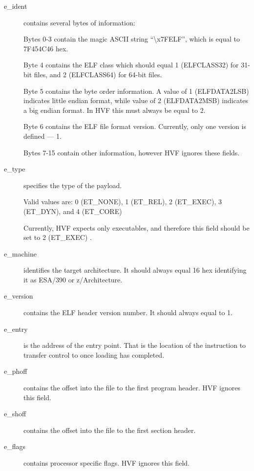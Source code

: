 \begin{description}
\item[e\_ident] contains several bytes of information:
	
	Bytes 0-3 contain the magic ASCII string ``\textbackslash x7FELF'', which is
	equal to 7F454C46 hex.

	Byte 4 contains the ELF class which should equal 1 \cbstart
	(ELFCLASS32) \cbend for 31-bit files, and 2 \cbstart (ELFCLASS64)
	\cbend for 64-bit files.

	Byte 5 contains the byte order information.  A value of 1 \cbstart
	(ELFDATA2LSB) \cbend indicates little endian format, while value of
	2 \cbstart (ELFDATA2MSB) \cbend indicates a big endian format.  In
	HVF this must always be equal to 2.

	Byte 6 contains the ELF file format version.  Currently, only one
	version is defined --- 1.

	Bytes 7-15 contain other information, however HVF ignores these
	fields.

\item[e\_type] specifies the type of the payload.

	\cbstart
	Valid values are: 0 (ET\_NONE), 1 (ET\_REL), 2 (ET\_EXEC), 3
	(ET\_DYN), and 4 (ET\_CORE)
	\cbend

	Currently, HVF expects only executables, and therefore this field
	should be set to 2 \cbstart (ET\_EXEC) \cbend.

\item[e\_machine] identifies the target architecture.  It should always
	equal 16 hex identifying it as ESA/390 or z/Architecture.

\item[e\_version] contains the ELF header version number.  It should always
	equal to 1.

\item[e\_entry] is the address of the entry point.  That is the location of
	the instruction to transfer control to once loading has completed.

\item[e\_phoff] contains the offset into the file to the first program
	header.  HVF ignores this field.

\item[e\_shoff] contains the offset into the file to the first section
	header.

\item[e\_flags] contains processor specific flags.  HVF ignores this field.


\end{description}
